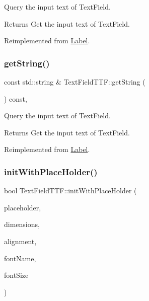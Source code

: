 Query the input text of Text\+Field. \begin{DoxyReturn}{Returns}
Get the input text of Text\+Field. 
\end{DoxyReturn}


Reimplemented from \hyperlink{classLabel_ab306634d58f4317fd96008a5ee67a7a7}{Label}.

\mbox{\label{classTextFieldTTF_a262a78ec2ef963b2fef8fcde2edc0895}} 
\subsubsection{\texorpdfstring{get\+String()}{getString()}\hspace{0.1cm}{\footnotesize\ttfamily [2/2]}}
{\footnotesize\ttfamily const std\+::string \& Text\+Field\+T\+T\+F\+::get\+String (\begin{DoxyParamCaption}\item[{void}]{ }\end{DoxyParamCaption}) const\hspace{0.3cm}{\ttfamily [override]}, {\ttfamily [virtual]}}

Query the input text of Text\+Field. \begin{DoxyReturn}{Returns}
Get the input text of Text\+Field. 
\end{DoxyReturn}


Reimplemented from \hyperlink{classLabel_ab306634d58f4317fd96008a5ee67a7a7}{Label}.

\mbox{\label{classTextFieldTTF_aec3f818b7717c3355b98f6c9bd4bcc3f}} 
\subsubsection{\texorpdfstring{init\+With\+Place\+Holder()}{initWithPlaceHolder()}\hspace{0.1cm}{\footnotesize\ttfamily [1/4]}}
{\footnotesize\ttfamily bool Text\+Field\+T\+T\+F\+::init\+With\+Place\+Holder (\begin{DoxyParamCaption}\item[{const std\+::string \&}]{placeholder,  }\item[{const \hyperlink{classSize}{Size} \&}]{dimensions,  }\item[{Text\+H\+Alignment}]{alignment,  }\item[{const std\+::string \&}]{font\+Name,  }\item[{float}]{font\+Size }\end{DoxyParamCaption})}

